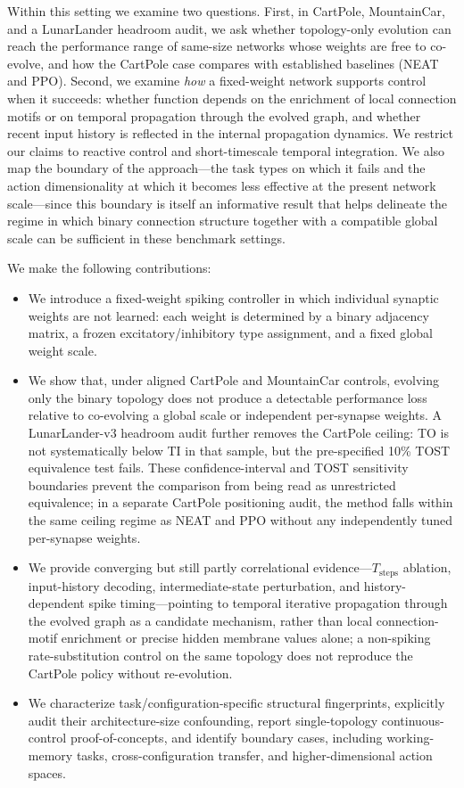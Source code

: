\documentclass[10pt]{article}
\begin{document}
Within this setting we examine two questions. First, in CartPole, MountainCar,
and a LunarLander headroom audit, we ask whether topology-only evolution can
reach the performance range of same-size networks whose weights are free to
co-evolve, and how the CartPole case compares with established baselines (NEAT
and PPO). Second, we examine
\emph{how} a fixed-weight network supports control when it succeeds: whether function depends on the enrichment of local
connection motifs or on temporal propagation through the evolved graph, and
whether recent input history is reflected in the internal propagation dynamics. We
restrict our claims to reactive control and short-timescale temporal
integration. We also map the boundary of the approach---the task types on which
it fails and the action dimensionality at which it becomes less effective at the present
network scale---since this boundary is itself an informative result that helps
delineate the regime in which binary connection structure together with a
compatible global scale can be sufficient in these benchmark settings.

We make the following contributions:
\begin{itemize}
\item We introduce a fixed-weight spiking controller in which individual
synaptic weights are not learned: each weight is determined by a binary
adjacency matrix, a frozen excitatory/inhibitory type assignment, and a fixed
global weight scale.
\item We show that, under aligned CartPole and MountainCar controls, evolving
only the binary topology does not produce a detectable performance loss relative
to co-evolving a global scale or independent per-synapse weights. A
LunarLander-v3 headroom audit further removes the CartPole ceiling: TO is not
systematically below TI in that sample, but the pre-specified 10\% TOST
equivalence test fails. These confidence-interval and TOST sensitivity
boundaries prevent the comparison from being read as unrestricted equivalence;
in a separate CartPole positioning audit, the method falls within the same
ceiling regime as NEAT and PPO without any independently tuned per-synapse
weights.
\item We provide converging but still partly correlational evidence---$T_\text{steps}$ ablation, input-history
decoding, intermediate-state perturbation, and history-dependent spike
timing---pointing to temporal iterative propagation through the evolved graph as
a candidate mechanism, rather than local connection-motif enrichment or precise
hidden membrane values alone; a non-spiking rate-substitution control on the
same topology does not reproduce the CartPole policy without re-evolution.
\item We characterize task/configuration-specific structural fingerprints,
explicitly audit their architecture-size confounding, report single-topology
continuous-control proof-of-concepts, and identify boundary cases, including
working-memory tasks, cross-configuration transfer, and higher-dimensional
action spaces.
\end{itemize}
\end{document}

